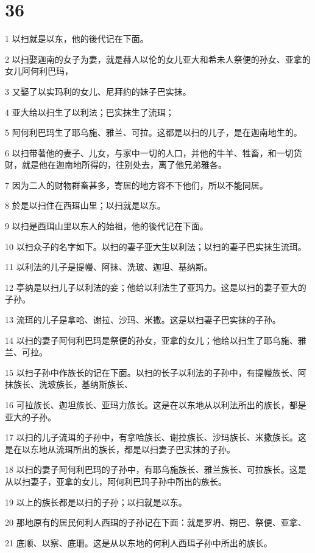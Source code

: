 \chapter{36}

\par 1 以扫就是以东，他的後代记在下面。
\par 2 以扫娶迦南的女子为妻，就是赫人以伦的女儿亚大和希未人祭便的孙女、亚拿的女儿阿何利巴玛，
\par 3 又娶了以实玛利的女儿、尼拜约的妹子巴实抹。
\par 4 亚大给以扫生了以利法；巴实抹生了流珥；
\par 5 阿何利巴玛生了耶乌施、雅兰、可拉。这都是以扫的儿子，是在迦南地生的。
\par 6 以扫带著他的妻子、儿女，与家中一切的人口，并他的牛羊、牲畜，和一切货财，就是他在迦南地所得的，往别处去，离了他兄弟雅各。
\par 7 因为二人的财物群畜甚多，寄居的地方容不下他们，所以不能同居。
\par 8 於是以扫住在西珥山里；以扫就是以东。
\par 9 以扫是西珥山里以东人的始祖，他的後代记在下面。
\par 10 以扫众子的名字如下。以扫的妻子亚大生以利法；以扫的妻子巴实抹生流珥。
\par 11 以利法的儿子是提幔、阿抹、洗玻、迦坦、基纳斯。
\par 12 亭纳是以扫儿子以利法的妾；他给以利法生了亚玛力。这是以扫的妻子亚大的子孙。
\par 13 流珥的儿子是拿哈、谢拉、沙玛、米撒。这是以扫妻子巴实抹的子孙。
\par 14 以扫的妻子阿何利巴玛是祭便的孙女，亚拿的女儿；他给以扫生了耶乌施、雅兰、可拉。
\par 15 以扫子孙中作族长的记在下面。以扫的长子以利法的子孙中，有提幔族长、阿抹族长、洗玻族长，基纳斯族长、
\par 16 可拉族长、迦坦族长、亚玛力族长。这是在以东地从以利法所出的族长，都是亚大的子孙。
\par 17 以扫的儿子流珥的子孙中，有拿哈族长、谢拉族长、沙玛族长、米撒族长。这是在以东地从流珥所出的族长，都是以扫妻子巴实抹的子孙。
\par 18 以扫的妻子阿何利巴玛的子孙中，有耶乌施族长、雅兰族长、可拉族长。这是从以扫妻子，亚拿的女儿，阿何利巴玛子孙中所出的族长。
\par 19 以上的族长都是以扫的子孙；以扫就是以东。
\par 20 那地原有的居民何利人西珥的子孙记在下面：就是罗坍、朔巴、祭便、亚拿、
\par 21 底顺、以察、底珊。这是从以东地的何利人西珥子孙中所出的族长。
